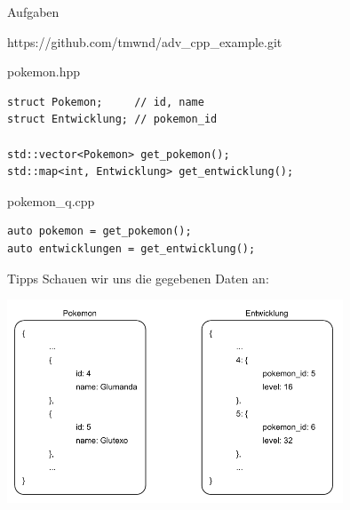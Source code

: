 \begin{frame}{Aufgaben}
    \begin{center}
        https://github.com/tmwnd/adv\_cpp\_example.git
    \end{center}
\end{frame}

\begin{frame}[fragile]{pokemon.hpp}
    \begin{verbatim}
struct Pokemon;     // id, name
struct Entwicklung; // pokemon_id

std::vector<Pokemon> get_pokemon();
std::map<int, Entwicklung> get_entwicklung();
    \end{verbatim}
\end{frame}



\begin{frame}[fragile]{pokemon\_q.cpp}
    \begin{verbatim}
auto pokemon = get_pokemon();
auto entwicklungen = get_entwicklung();
    \end{verbatim}
\end{frame}

\begin{frame}{Tipps}
    Schauen wir uns die gegebenen Daten an:

    \begin{center}
        \includegraphics[width=0.75\textwidth]{pictures/example_1.pdf}
    \end{center}
\end{frame}

